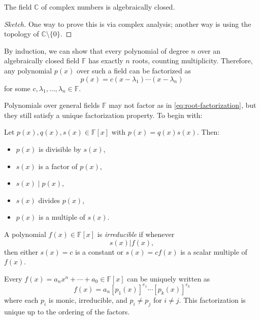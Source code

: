 \begin{theorem}
The field \(\mathbb{C}\) of complex numbers is algebraically closed.
\end{theorem}

\begin{proof}[Sketch]
One way to prove this is via complex analysis; another way is using the topology of \(\mathbb{C} \setminus \{0\}\).
\end{proof}

By induction, we can show that every polynomial of degree \(n\) over an algebraically closed field \(\mathbb{F}\) has exactly \(n\) roots, counting multiplicity. Therefore, any polynomial \(p(x)\) over such a field can be factorized as
\begin{equation}\label{eq:root-factorization}
p(x) = c(x - \lambda_1)\cdots(x - \lambda_n)
\end{equation}
for some \(c, \lambda_1, \dots, \lambda_n \in \mathbb{F}\).

Polynomials over general fields \(\mathbb{F}\) may not factor as in \eqref{eq:root-factorization}, but they still satisfy a unique factorization property. To begin with:
\begin{definition}[Divisibility]
Let \(p(x), q(x), s(x) \in \mathbb{F}[x]\) with \(p(x) = q(x) s(x)\). Then:
\begin{itemize}
    \item \(p(x)\) is divisible by \(s(x)\),
    \item \(s(x)\) is a factor of \(p(x)\),
    \item \(s(x) \mid p(x)\),
    \item \(s(x)\) divides \(p(x)\),
    \item \(p(x)\) is a multiple of \(s(x)\).
\end{itemize}
\end{definition}

\begin{definition}
A polynomial $f(x) \in \mathbb{F}[x]$ is {\it irreducible} if whenever
$$s(x) | f(x),$$
then either $s(x) = c$ is a constant or $s(x) = cf(x)$ is a scalar multiple of $f(x)$.
\end{definition}

\begin{theorem}
Every \(f(x) = a_n x^n + \cdots + a_0 \in \mathbb{F}[x]\) can be uniquely written as
\[
f(x) = a_n [p_1(x)]^{e_1} \cdots [p_k(x)]^{e_k}
\]
where each \(p_i\) is monic, irreducible, and \(p_i \neq p_j\) for \(i \neq j\). This factorization is unique up to the ordering of the factors.
\end{theorem}



